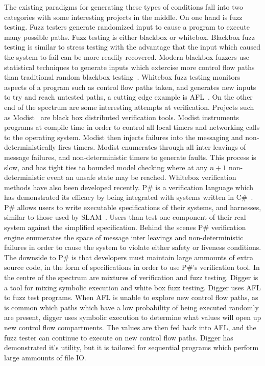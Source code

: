 The existing paradigms for generating these types of conditions fall into two
categories with some interesting projects in the middle. On one hand is fuzz
testing. Fuzz testers generate randomized input to cause a program to execute
many possible paths.  Fuzz testing is either blackbox or whitebox.  Blackbox
fuzz testing is similar to stress testing with the advantage that the input
which caused the system to fail can be more readily recovered. Modern blackbox
fuzzers use statistical techniques to generate inputs which extercise more
control flow paths than traditional random blackbox
testing~\cite{HouseholderProbabilityBasedParameter2012}. Whitebox fuzz testing
monitors aspects of a program such as control flow paths taken, and generates
new inputs to try and reach untested paths, a cutting edge example is
AFL~\cite{afl}. On the other end of the spectrum are some interesting attempts
at verification. Projects such as Modist~\cite{Yang:2009:MTM:1558977.1558992}
are black box distributed verification tools.  Modist instruments programs at
compile time in order to control all local timers and networking calls to the
operating system.  Modist then injects failures into the messaging and
non-deterministically fires timers. Modist enumerates through all inter
leavings of message failures, and non-deterministic timers to generate faults.
This process is slow, and has tight ties to bounded model checking where at any
$n+1$ non-deterministic event an unsafe state may be reached.  Whitebox
verification methods have also been developed recently. P\# is a verification
language which has demonstrated its efficacy by being integrated with systems
written in C\#~\cite{}. P\# allows users to write executable specifications of
their systems, and harnesses, similar to those used by SLAM~\cite{}. Users than
test one component of their real system against the simplified specification.
Behind the scenes P\# verification engine enumerates the space of message inter
leavings and non-deterministic failures in order to cause the system to violate
either safety or liveness conditions. The downside to P\# is that developers
must maintain large ammounts of extra source code, in the form of
specifications in order to use P\#'s verification tool. In the centre of the
spectrum are mixtures of verification and fuzz testing.  Digger is a tool for
mixing symbolic execution and white box fuzz testing.  Digger uses AFL to fuzz
test programs. When AFL is unable to explore new control flow paths, as is
common which paths which have a low probability of being executed randomly are
present, digger uses symbolic execution to determine what values will open up
new control flow compartments. The values are then fed back into AFL, and the
fuzz tester can continue to execute on new control flow paths. Digger has
demonstrated it's utility, but it is tailored for sequential programs which
perform large ammounts of file IO.


